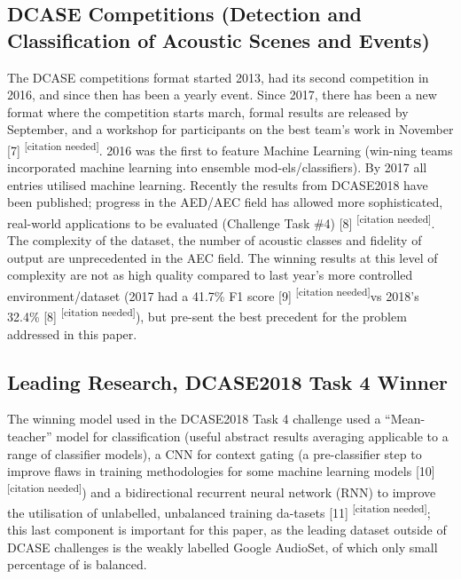 \documentclass{UoNMCHA}
\newcommand{\citationneeded}{\textsuperscript{\color{blue} [citation needed]}}
\numberwithin{equation}{section}
\begin{document}
\subsection{DCASE Competitions (Detection and Classification of Acoustic Scenes and Events)}
The DCASE competitions format started 2013, had its second competition in 2016, and since then has been a yearly event. Since 2017, there has been a new format where the competition starts march, formal results are released by September, and a workshop for participants on the best team’s work in November [7]\citationneeded. 2016 was the first to feature Machine Learning (win-ning teams incorporated machine learning into ensemble mod-els/classifiers). By 2017 all entries utilised machine learning. Recently the results from DCASE2018 have been published; progress in the AED/AEC field has allowed more sophisticated, real-world applications to be evaluated (Challenge Task \#4) [8]\citationneeded. The complexity of the dataset, the number of acoustic classes and fidelity of output are unprecedented in the AEC field. The winning results at this level of complexity are not as high quality compared to last year’s more controlled environment/dataset (2017 had a 41.7\% F1 score [9]\citationneeded vs 2018’s 32.4\% [8]\citationneeded), but pre-sent the best precedent for the problem addressed in this paper.

\subsection{Leading Research, DCASE2018 Task 4 Winner}
The winning model used in the DCASE2018 Task 4 challenge used a “Mean-teacher” model for classification (useful abstract results averaging applicable to a range of classifier models), a CNN for context gating (a pre-classifier step to improve flaws in training methodologies for some machine learning models [10]\citationneeded) and a bidirectional recurrent neural network (RNN) to improve the utilisation of unlabelled, unbalanced training da-tasets [11]\citationneeded; this last component is important for this paper, as the leading dataset outside of DCASE challenges is the weakly labelled Google AudioSet, of which only small percentage of is balanced.
\end{document}
